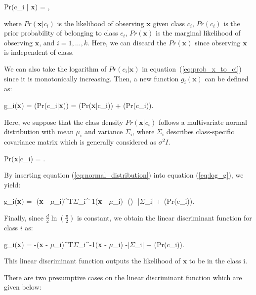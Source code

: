 \be
    \label{eq:prob_x_to_ci}
   Pr(c_{i} | \textbf{x}) = , 
\ee

where $Pr(\textbf{x}|c_{i})$ is the likelihood of observing $\textbf{x}$ given class $c_{i}$, $Pr(c_{i})$ is the prior probability of belonging to class $c_{i}$, $Pr(\textbf{x})$ is the marginal likelihood of observing $\textbf{x}$, and $i = 1, \dots, k$. Here, we can discard the $Pr(\textbf{x})$ since observing $\textbf{x}$ is independent of class.

We can also take the logarithm of $Pr(c_{i} | \textbf{x})$ in equation~(\ref{eq:prob_x_to_ci}) since it is monotonically increasing. Then, a new function $g_{i}(\textbf{x})$ can be defined as:

\be
\label{eq:log_g}
g_{i}(\textbf{x}) = \ln(Pr(c_{i}|\textbf{x})) = \ln(Pr(\textbf{x}|c_{i})) + \ln(Pr(c_{i}))\:.
\ee

Here, we suppose that the class density $Pr(\textbf{x}|c_{i})$ follows a multivariate normal distribution with mean $\textbf{$\mu$}_{i}$ and variance $\textbf{$\Sigma$}_{i}$, where $\textbf{$\Sigma$}_{i}$ describes class-specific covariance matrix which is generally considered as $\sigma^{2}I$.

\be
\label{eq:normal_distribution}
Pr(\textbf{x}|c_{i}) =  \exp {}.
\ee

By inserting equation (\ref{eq:normal_distribution}) into equation (\ref{eq:log_g}), we yield:

\be
\label{eq:prior_linear_disc_func}
g_{i}(\textbf{x}) = -(\textbf{x} - \textbf{$\mu$}_{i})^{T}{\textbf{$\Sigma$}_{i}}^{-1}(\textbf{x} - \textbf{$\mu$}_{i}) -\ln() -\ln|\textbf{$\Sigma$}_{i}| + \ln(Pr(c_{i}))\:.
\ee

Finally, since $\frac{d}{2}\ln(\frac{\pi}{2})$ is constant, we obtain the linear discriminant function for class $i$ as:

\be
\label{eq:linear_disc_func}
g_{i}(\textbf{x}) = -(\textbf{x} - \textbf{$\mu$}_{i})^{T}{\textbf{$\Sigma$}_{i}}^{-1}(\textbf{x} - \textbf{$\mu$}_{i}) -\ln|\textbf{$\Sigma$}_{i}| + \ln(Pr(c_{i}))\:.
\ee

This linear discriminant function outputs the likelihood of $\textbf{x}$ to be in the class {i}.

There are two presumptive cases on the linear discriminant function which are given below: 

